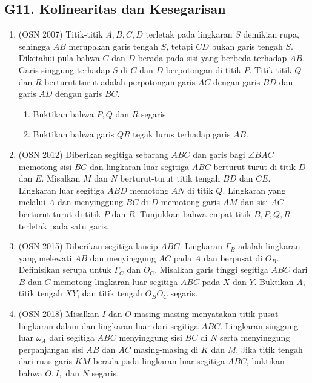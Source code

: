 \documentclass[12pt,a4paper]{article}
\begin{document}
\subsection{G11. Kolinearitas dan Kesegarisan}
\begin{enumerate}

\item (OSN 2007) Titik-titik $A, B, C, D$ terletak pada lingkaran $S$ demikian rupa, sehingga $AB$ merupakan garis tengah $S$, tetapi $CD$ bukan garis tengah $S$. Diketahui pula bahwa $C$ dan $D$ berada pada sisi yang berbeda terhadap $AB$. Garis singgung terhadap $S$ di $C$ dan $D$ berpotongan di titik $P$. Titik-titik $Q$ dan $R$ berturut-turut adalah perpotongan garis $AC$ dengan garis $BD$ dan garis $AD$ dengan garis $BC$.
\begin{enumerate}
    \item Buktikan bahwa $P,Q$ dan $R$ segaris.
    \item Buktikan bahwa garis $QR$ tegak lurus terhadap garis $AB$.
\end{enumerate}

\item (OSN 2012) Diberikan segitiga sebarang $ABC$ dan garis bagi $\angle BAC$ memotong sisi $BC$ dan lingkaran luar segitiga $ABC$ berturut-turut di titik $D$ dan $E$. Misalkan $M$ dan $N$ berturut-turut titik tengah $BD$ dan $CE$. Lingkaran luar segitiga $ABD$ memotong $AN$ di titik $Q$. Lingkaran yang melalui $A$ dan menyinggung $BC$ di $D$ memotong garis $AM$ dan sisi $AC$ berturut-turut di titik $P$ dan $R$. Tunjukkan bahwa empat titik $B, P, Q, R$ terletak pada satu garis.

\item (OSN 2015) Diberikan segitiga lancip $ABC$. Lingkaran $\Gamma_{B}$ adalah lingkaran yang melewati $AB$ dan menyinggung $AC$ pada $A$ dan berpusat di $O_{B}$. Definisikan serupa untuk $\Gamma_{C}$ dan $O_{C}$. Misalkan garis tinggi segitiga $ABC$ dari $B$ dan $C$ memotong lingkaran luar segitiga $ABC$ pada $X$ dan $Y$. Buktikan $A$, titik tengah $XY$, dan titik tengah $O_{B}O_{C}$ segaris.

\item (OSN 2018) Misalkan $I$ dan $O$ masing-masing menyatakan titik pusat lingkaran dalam dan lingkaran luar dari segitiga $ABC$. Lingkaran singgung luar $\omega_{A}$ dari segitiga $ABC$ menyinggung sisi $BC$ di $N$ serta menyinggung perpanjangan sisi $AB$ dan $AC$ masing-masing di $K$ dan $M$. Jika titik tengah dari ruas garis $KM$ berada pada lingkaran luar segitiga $ABC$, buktikan bahwa $O, I,$ dan $N$ segaris.


\end{enumerate}
\end{document}
